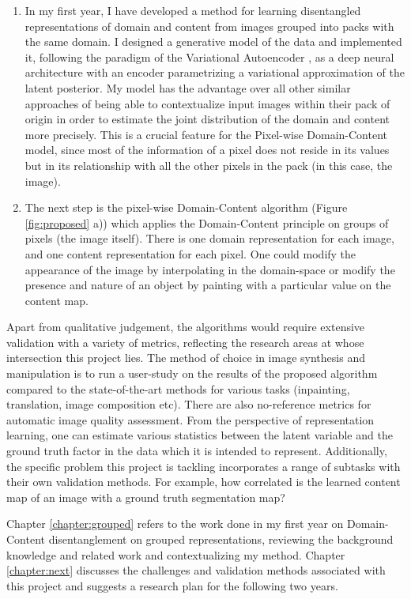 \documentclass[withindex,glossary,firstyr,times]{cam-thesis}
\begin{document}
\begin{enumerate}
    \item In my first year, I have developed a method for learning disentangled representations of domain and content from images grouped into packs with the same domain. I designed a generative model of the data and implemented it, following the paradigm of the Variational Autoencoder \cite{kingma2013auto, rezende2014stochastic}, as a deep neural architecture with an encoder parametrizing a variational approximation of the latent posterior. My model has the advantage over all other similar approaches of being able to contextualize input images within their pack of origin in order to estimate the joint distribution of the domain and content more precisely. This is a crucial feature for the Pixel-wise Domain-Content model, since most of the information of a pixel does not reside in its values but in its relationship with all the other pixels in the pack (in this case, the image).
    
    \item The next step is the pixel-wise Domain-Content algorithm (Figure \ref{fig:proposed} a)) which applies the Domain-Content principle on groups of pixels (the image itself). There is one domain representation for each image, and one content representation for each pixel. One could modify the appearance of the image by interpolating in the domain-space or modify the presence and nature of an object by painting with a particular value on the content map.
\end{enumerate}

Apart from qualitative judgement, the algorithms would require extensive validation with a variety of metrics, reflecting the research areas at whose intersection this project lies. The method of choice in image synthesis and manipulation is to run a user-study on the results of the proposed algorithm compared to the state-of-the-art methods for various tasks (inpainting, translation, image composition etc). There are also no-reference metrics for automatic image quality assessment. From the perspective of representation learning, one can estimate various statistics between the latent variable and the ground truth factor in the data which it is intended to represent. Additionally, the specific problem this project is tackling incorporates a range of subtasks with their own validation methods. For example, how correlated is the learned content map of an image with a ground truth segmentation map?

Chapter \ref{chapter:grouped} refers to the work done in my first year on Domain-Content disentanglement on grouped representations, reviewing the background knowledge and related work and contextualizing my method. Chapter \ref{chapter:next} discusses the challenges and validation methods associated with this project and suggests a research plan for the following two years.
\end{document}

